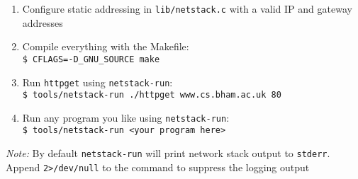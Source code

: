 \begin{appendices}
\begin{enumerate}
    \item Configure static addressing in \texttt{lib/netstack.c} with a valid IP and gateway addresses
    \item Compile everything with the Makefile:\\
        \texttt{\$ CFLAGS=-D\_GNU\_SOURCE make}
    \item Run \texttt{httpget} using \texttt{netstack-run}:\\
        \texttt{\$ tools/netstack-run ./httpget www.cs.bham.ac.uk 80} %
    \item Run any program you like using \texttt{netstack-run}:\\
        \texttt{\$ tools/netstack-run <your program here>}
\end{enumerate}

\medskip

\textit{Note:} By default \texttt{netstack-run} will print network stack output to \texttt{stderr}. Append \texttt{2>/dev/null} to the command to suppress the logging output

\twocolumn

\end{appendices}
